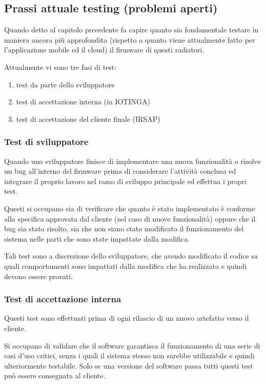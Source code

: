 \documentclass[a4paper,titlepage]{article}
\begin{document}
\subsection{Prassi attuale testing (problemi aperti)}

Quando detto al capitolo precedente fa capire quanto sia fondamentale testare in maniera
ancora più approfondita (rispetto a quanto viene attualmente fatto per l'applicazione
mobile ed il cloud) il firmware di questi radiatori.

Attualmente vi sono tre fasi di test:
\begin{enumerate}
    \item test da parte dello sviluppatore
    \item test di accettazione interna (in IOTINGA)
    \item test di accettazione del cliente finale (IRSAP)
\end{enumerate}

\subsubsection{Test di sviluppatore}

Quando uno sviluppatore finisce di implementare una nuova funzionalità o risolve un
bug all'interno del firmware prima di considerare l'attività conclusa ed integrare il
proprio lavoro nel ramo di sviluppo principale ed effettua i propri test.

Questi si occupano sia di verificare che quanto è stato implementato è conforme
alla specifica approvata dal cliente (nel caso di nuove funzionalità) oppure che
il bug sia stato risolto, sia che non siano stato modificato il funzionamento del sistema
nelle parti che sono state impattate dalla modifica.

Tali test sono a discrezione dello sviluppatore, che avendo modificato il codice sa
quali comportamenti sono impattati dalla modifica che ha realizzato e quindi devono essere
provati.

\subsubsection{Test di accettazione interna}

Questi test sono effettuati prima di ogni rilascio di un nuovo artefatto verso il cliente.

Si occupano di validare che il software garantisca il funzionamento di una serie di casi d'uso critici,
senza i quali il sistema stesso non sarebbe utilizzabile e quindi ulteriormente testabile.
Solo se una versione del software passa tutti questi test può essere consegnata al cliente.
\end{document}
